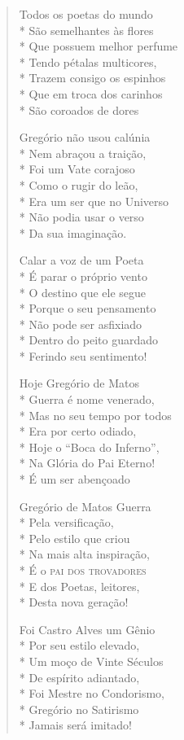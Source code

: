 \begin{verse}
Todos os poetas do mundo\\*
São semelhantes às flores\\*
Que possuem melhor perfume\\*
Tendo pétalas multicores,\\*
Trazem consigo os espinhos\\*
Que em troca dos carinhos\\*
São coroados de dores

Gregório não usou calúnia\\*
Nem abraçou a traição,\\*
Foi um Vate corajoso\\*
Como o rugir do leão,\\*
Era um ser que no Universo\\*
Não podia usar o verso\\*
Da sua imaginação.

Calar a voz de um Poeta\\*
É parar o próprio vento\\*
O destino que ele segue\\*
Porque o seu pensamento\\*
Não pode ser asfixiado\\*
Dentro do peito guardado\\*
Ferindo seu sentimento!

Hoje Gregório de Matos\\*
Guerra é nome venerado,\\*
Mas no seu tempo por todos\\*
Era por certo odiado,\\*
Hoje o ``Boca do Inferno'',\\*
Na Glória do Pai Eterno!\\*
É um ser abençoado

Gregório de Matos Guerra\\*
Pela versificação,\\*
Pelo estilo que criou\\*
Na mais alta inspiração,\\*
É o \textsc{pai dos trovadores}\\*
E dos Poetas, leitores,\\*
Desta nova geração!

Foi Castro Alves um Gênio\\*
Por seu estilo elevado,\\*
Um moço de Vinte Séculos\\*
De espírito adiantado,\\*
Foi Mestre no Condorismo,\\*
Gregório no Satirismo\\*
Jamais será imitado!


\end{verse}
